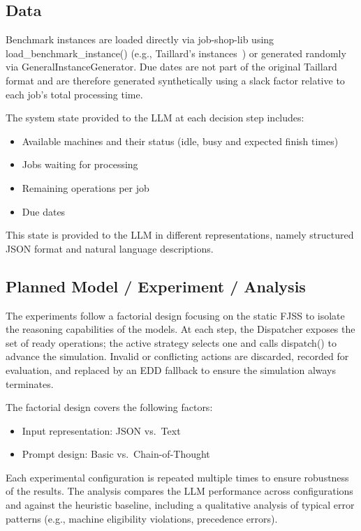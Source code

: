 \documentclass{article}
\begin{document}
\subsection{Data}

Benchmark instances are loaded directly via job-shop-lib using
load\_benchmark\_instance() (e.g., Taillard's
instances~\cite{taillardBenchmarksBasicScheduling1993}) or generated randomly via
GeneralInstanceGenerator. Due dates are not part of the original
Taillard format and are therefore generated synthetically using a slack factor
relative to each job's total processing time.
 
The system state provided to the LLM at each decision step includes:
 
\begin{itemize}
  \item Available machines and their status (idle, busy and
    expected finish times)
  \item Jobs waiting for processing
  \item Remaining operations per job
  \item Due dates
\end{itemize}
 
This state is provided to the LLM in different representations, namely
structured JSON format and natural language descriptions.

\subsection{Planned Model / Experiment / Analysis}

The experiments follow a factorial design focusing on the static FJSS to
isolate the reasoning capabilities of the models. At each step, the
Dispatcher exposes the set of ready operations; the active strategy
selects one and calls dispatch() to advance the simulation. Invalid
or conflicting actions are discarded, recorded for evaluation, and replaced by
an EDD fallback to ensure the simulation always terminates.
 
The factorial design covers the following factors:
 
\begin{itemize}
  \item Input representation: JSON vs.\ Text
  \item Prompt design: Basic vs.\ Chain-of-Thought
\end{itemize}
 
Each experimental configuration is repeated multiple times to ensure
robustness of the results. The analysis compares the LLM performance across
configurations and against the heuristic baseline, including a qualitative
analysis of typical error patterns (e.g., machine eligibility violations,
precedence errors).
\end{document}
